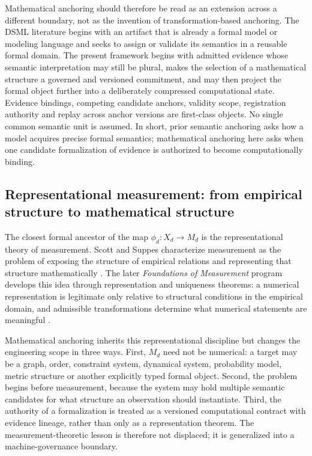 \documentclass[11pt,a4paper]{article}
\begin{document}
Mathematical anchoring should therefore be read as an extension across a different boundary, not as the invention of transformation-based anchoring. The DSML literature begins with an artifact that is already a formal model or modeling language and seeks to assign or validate its semantics in a reusable formal domain. The present framework begins with admitted evidence whose semantic interpretation may still be plural, makes the selection of a mathematical structure a governed and versioned commitment, and may then project the formal object further into a deliberately compressed computational state. Evidence bindings, competing candidate anchors, validity scope, registration authority and replay across anchor versions are first-class objects. No single common semantic unit is assumed. In short, prior semantic anchoring asks how a model acquires precise formal semantics; mathematical anchoring here asks when one candidate formalization of evidence is authorized to become computationally binding.

\subsection{Representational measurement: from empirical structure to mathematical structure}
The closest formal ancestor of the map $\phi_d:X_d\rightarrow M_d$ is the representational theory of measurement. Scott and Suppes characterize measurement as the problem of exposing the structure of empirical relations and representing that structure mathematically \cite{scottSuppes1958}. The later \emph{Foundations of Measurement} program develops this idea through representation and uniqueness theorems: a numerical representation is legitimate only relative to structural conditions in the empirical domain, and admissible transformations determine what numerical statements are meaningful \cite{krantz1971}.

Mathematical anchoring inherits this representational discipline but changes the engineering scope in three ways. First, $M_d$ need not be numerical: a target may be a graph, order, constraint system, dynamical system, probability model, metric structure or another explicitly typed formal object. Second, the problem begins before measurement, because the system may hold multiple semantic candidates for what structure an observation should instantiate. Third, the authority of a formalization is treated as a versioned computational contract with evidence lineage, rather than only as a representation theorem. The measurement-theoretic lesson is therefore not displaced; it is generalized into a machine-governance boundary.
\end{document}
